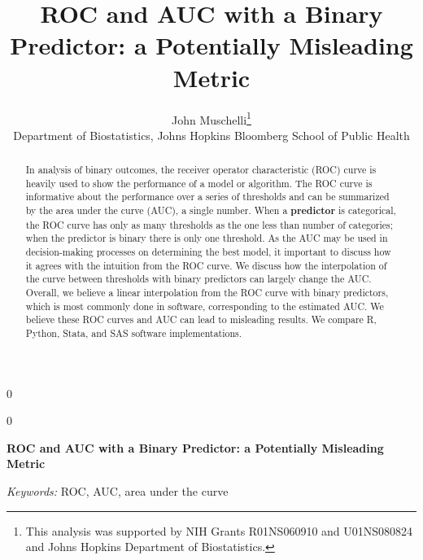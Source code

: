 \documentclass[12pt]{article}
\newcommand{\blind}{0}
\begin{document}
%

\def\spacingset#1{\renewcommand{\baselinestretch}%
{#1}\small\normalsize} \spacingset{1}



\blind
{
  \title{\bf ROC and AUC with a Binary Predictor: a Potentially Misleading Metric} 
  \author{John Muschelli\thanks{This analysis was supported by NIH Grants R01NS060910 and U01NS080824 and Johns Hopkins Department of Biostatistics. }\hspace{.2cm}\\
	Department of Biostatistics, Johns Hopkins Bloomberg School of Public Health}
  \maketitle
} \fi

\blind
{
  \bigskip
  \bigskip
  \bigskip
  \begin{center}
    {\LARGE\bf ROC and AUC with a Binary Predictor: a Potentially Misleading Metric}
\end{center}
  \medskip
} \fi

\bigskip
\begin{abstract}
In analysis of binary outcomes, the receiver operator characteristic
(ROC) curve is heavily used to show the performance of a model or
algorithm. The ROC curve is informative about the performance over a
series of thresholds and can be summarized by the area under the curve
(AUC), a single number. When a \textbf{predictor} is categorical, the
ROC curve has only as many thresholds as the one less than number of
categories; when the predictor is binary there is only one threshold. As
the AUC may be used in decision-making processes on determining the best
model, it important to discuss how it agrees with the intuition from the
ROC curve. We discuss how the interpolation of the curve between
thresholds with binary predictors can largely change the AUC. Overall,
we believe a linear interpolation from the ROC curve with binary
predictors, which is most commonly done in software, corresponding to
the estimated AUC. We believe these ROC curves and AUC can lead to
misleading results. We compare R, Python, Stata, and SAS software
implementations.
\end{abstract}

\noindent%
{\it Keywords:}  ROC, AUC, area under the curve
\vfill

\newpage
\spacingset{1.45} %
\end{document}
